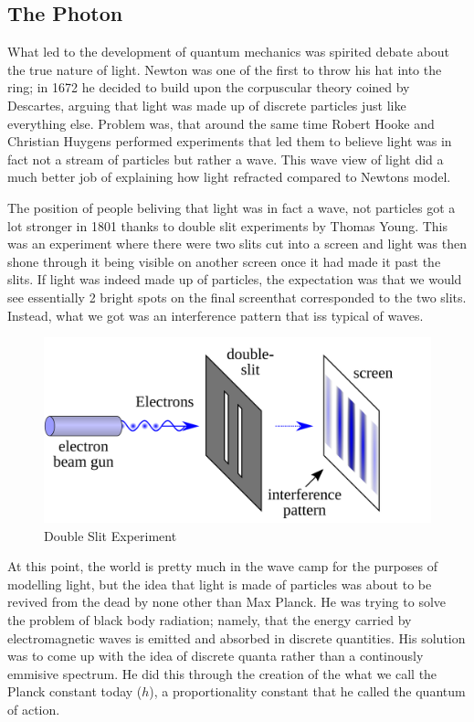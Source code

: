\subsection{The Photon}

What led to the development of quantum mechanics was spirited debate about the true nature of light.
Newton was one of the first to throw his hat into the ring; in 1672 he decided to build upon the corpuscular theory coined by Descartes, arguing that light was made up of discrete particles just like everything else.
Problem was, that around the same time Robert Hooke and Christian Huygens performed experiments  that led them to believe light was in fact not a stream of particles but rather a wave.
This wave view of light did a much better job of explaining how light refracted compared to Newtons model.

The position of people beliving that light was in fact a wave, not particles got a lot stronger in 1801 thanks to double slit experiments by Thomas Young.
This was an experiment where there were two slits cut into a screen and light was then shone through it being visible on another screen once it had made it past the slits.
If light was indeed made up of particles, the expectation was that we would see essentially 2 bright spots on the final screenthat corresponded to the two slits.
Instead, what we got was an interference pattern that iss typical of waves.

\begin{figure}[H]
  \centering
  \includegraphics[width=130mm]{figures/doubleSlit.png}
  \caption{Double Slit Experiment}
  \label{doubleSlit}
\end{figure}

At this point, the world is pretty much in the wave camp for the purposes of modelling light, but the idea that light is made of particles was about to be revived from the dead by none other than Max Planck.
He was trying to solve the problem of black body radiation; namely, that the energy carried by electromagnetic waves is emitted and absorbed in discrete quantities.
His solution was to  come up with the idea of discrete quanta rather than a continously emmisive spectrum.
He did this through the creation of the what we call the Planck constant today ($h$), a proportionality constant  that he called  the quantum of action.

